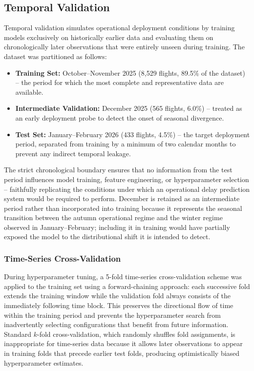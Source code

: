 \documentclass{report}
\begin{document}
\subsection{Temporal Validation}

Temporal validation simulates operational deployment conditions by training
models exclusively on historically earlier data and evaluating them on
chronologically later observations that were entirely unseen during training.
The dataset was partitioned as follows:

\begin{itemize}
  \item \textbf{Training Set:} October--November 2025 (8,529 flights, 89.5\%
        of the dataset) -- the period for which the most complete and
        representative data are available.
  \item \textbf{Intermediate Validation:} December 2025 (565 flights, 6.0\%)
        -- treated as an early deployment probe to detect the onset of
        seasonal divergence.
  \item \textbf{Test Set:} January--February 2026 (433 flights, 4.5\%) --
        the target deployment period, separated from training by a minimum
        of two calendar months to prevent any indirect temporal leakage.
\end{itemize}

The strict chronological boundary ensures that no information from the test
period influences model training, feature engineering, or hyperparameter
selection -- faithfully replicating the conditions under which an operational
delay prediction system would be required to perform.  December is retained
as an intermediate period rather than incorporated into training because it
represents the seasonal transition between the autumn operational regime and
the winter regime observed in January--February; including it in training
would have partially exposed the model to the distributional shift it is
intended to detect.

\subsubsection*{Time-Series Cross-Validation}

During hyperparameter tuning, a 5-fold time-series cross-validation scheme
was applied to the training set using a forward-chaining approach: each
successive fold extends the training window while the validation fold always
consists of the immediately following time block.  This preserves the
directional flow of time within the training period and prevents the
hyperparameter search from inadvertently selecting configurations that benefit
from future information.  Standard $k$-fold cross-validation, which randomly
shuffles fold assignments, is inappropriate for time-series data because it
allows later observations to appear in training folds that precede earlier
test folds, producing optimistically biased hyperparameter estimates.
\end{document}
